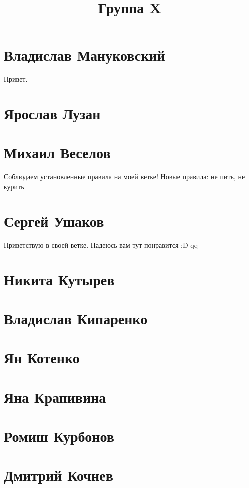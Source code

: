 \documentclass{article}
\title{Группа X}
\begin{document}
\section*{Владислав Мануковский}
Привет.
\section*{Ярослав Лузан}

\section*{Михаил Веселов}

Соблюдаем установленные правила на моей ветке!
Новые правила: не пить, не курить

\section*{Сергей Ушаков}

Приветствую в своей ветке. Надеюсь вам тут понравится :D qq

\section*{Никита Кутырев}

\section*{Владислав Кипаренко}

\section*{Ян Котенко}

\section*{Яна Крапивина}

\section*{Ромиш Курбонов}

\section*{Дмитрий Кочнев}
\end{document}

